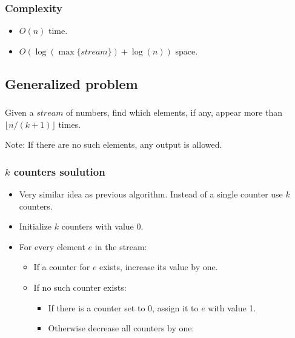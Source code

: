 \documentclass[table]{beamer}
\makeatletter
\newcommand*{\currentname}{\@currentlabelname}
\makeatother
\begin{document}
\begin{frame}
    \frametitle{Complexity}
    \begin{itemize}
        \item $O(n)$ time.
        \item $O(\log(\max\{stream\}) + \log(n))$ space.
    \end{itemize}
\end{frame}

\subsection{Generalized problem}
\begin{frame}
    \frametitle{\currentname}
    Given a $stream$ of numbers, find which elements, if any, appear more than $\lfloor n/(k + 1) \rfloor$ times.

    Note: If there are no such elements, any output is allowed.
\end{frame}

\begin{frame}
    \frametitle{$k$ counters soulution}

    \begin{itemize}
        \item Very similar idea as previous algorithm. Instead of a single counter use $k$ counters.
        \item Initialize $k$ counters with value 0.
        \item For every element $e$ in the stream:
        \begin{itemize}
            \item If a counter for $e$ exists, increase its value by one.
            \item If no such counter exists:
                \begin{itemize}
                    \item If there is a counter set to 0, assign it to $e$ with value 1.
                    \item Otherwise decrease all counters by one.
                \end{itemize}
        \end{itemize}
    \end{itemize}
\end{frame}
\end{document}
